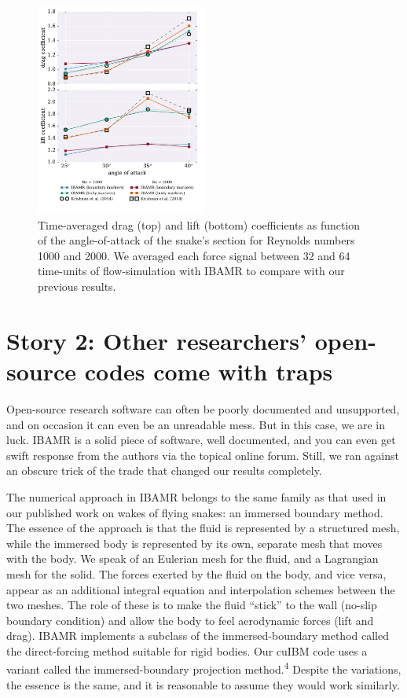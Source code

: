 \documentclass[9pt,twocolumn,twoside]{article}
\newlength{\up}
\begin{document}
\begin{figure}[h]
\centering
\includegraphics[width=0.5\textwidth]{./figures/ibamr/ibamr_forceCoefficientsVsAoA.pdf}
\caption{
Time-averaged drag (top) and lift (bottom) coefficients as function of the angle-of-attack of the snake's section for Reynolds numbers 1000 and 2000.
We averaged each force signal between 32 and 64 time-units of flow-simulation with IBAMR to compare with our previous results.}
\label{figure6}
\end{figure}



\section*{Story 2: Other researchers' open-source codes come with traps}

Open-source research software can often be poorly documented and unsupported, and on occasion it can even be an unreadable mess. 
But in this case, we are in luck.
IBAMR is a solid piece of software, well documented, and you can even get swift response from the authors via the topical online forum.
Still, we ran against an obscure trick of the trade that changed our results completely. 

The numerical approach in IBAMR belongs to the same family as that used in our published work on wakes of flying snakes: an immersed boundary method. 
The essence of the approach is that the fluid is represented by a structured mesh, while the immersed body is represented by its own, separate mesh that moves with the body. 
We speak of an Eulerian mesh for the fluid, and a Lagrangian mesh for the solid. 
The forces exerted by the fluid on the body, and vice versa, appear as an additional integral equation and interpolation schemes between the two meshes. 
The role of these is to make the fluid ``stick'' to the wall (no-slip boundary condition) and allow the body to feel aerodynamic forces (lift and drag).
IBAMR implements a subclass of the immersed-boundary method called the direct-forcing method suitable for rigid bodies.
Our cuIBM code uses a variant called the immersed-boundary projection method.\textsuperscript{4}
Despite the variations, the essence is the same, and it is reasonable to assume they would work similarly.
\end{document}
